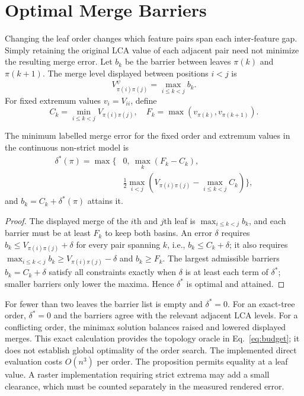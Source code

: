 \documentclass{vgtc}                %
\begin{document}
\section{Optimal Merge Barriers}\label{sec:barriers}
Changing the leaf order changes which feature pairs span each inter-feature gap. Simply retaining the original LCA value of each adjacent pair need not minimize the resulting merge error. Let $b_k$ be the barrier between leaves $\pi(k)$ and $\pi(k+1)$. The merge level displayed between positions $i<j$ is
\begin{equation}\label{eq:maxbarrier}
 V_{\pi(i)\pi(j)}^{\psi}=\max_{i\le k<j}b_k.
\end{equation}
For fixed extremum values $v_i=V_{ii}$, define
\begin{equation}
 C_k=\min_{i\le k<j}V_{\pi(i)\pi(j)},\quad
 F_k=\max(v_{\pi(k)},v_{\pi(k+1)}).
\end{equation}
\begin{proposition}\label{prop:barriers}
The minimum labelled merge error for the fixed order and extremum values in the continuous non-strict model is
\begin{equation}\label{eq:delta}
\begin{split}
\delta^*(\pi)=\max\bigg\{&0,\ \max_k(F_k-C_k),\\
 &\frac12\max_{i<j}\left(V_{\pi(i)\pi(j)}-
                         \max_{i\le k<j}C_k\right)\bigg\},
\end{split}
\end{equation}
and $b_k=C_k+\delta^*(\pi)$ attains it.
\end{proposition}
\begin{proof}
The displayed merge of the $i$th and $j$th leaf is $\max_{i\le k<j}b_k$, and each barrier must be at least $F_k$ to keep both basins. An error $\delta$ requires $b_k\le V_{\pi(i)\pi(j)}+\delta$ for every pair spanning $k$, i.e., $b_k\le C_k+\delta$; it also requires $\max_{i\le k<j}b_k\ge V_{\pi(i)\pi(j)}-\delta$ and $b_k\ge F_k$. The largest admissible barriers $b_k=C_k+\delta$ satisfy all constraints exactly when $\delta$ is at least each term of $\delta^*$; smaller barriers only lower the maxima. Hence $\delta^*$ is optimal and attained.
\end{proof}
For fewer than two leaves the barrier list is empty and $\delta^*=0$. For an exact-tree order, $\delta^*=0$ and the barriers agree with the relevant adjacent LCA levels. For a conflicting order, the minimax solution balances raised and lowered displayed merges. This exact calculation provides the topology oracle in Eq.~\ref{eq:budget}; it does not establish global optimality of the order search. The implemented direct evaluation costs $O(n^3)$ per order. The proposition permits equality at a leaf value. A raster implementation requiring strict extrema may add a small clearance, which must be counted separately in the measured rendered error.
\end{document}
